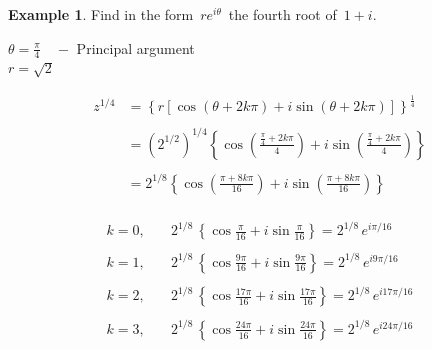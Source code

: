 \documentclass[11pt,a4paper]{article}
\theoremstyle{definition}
\newtheorem{example}[thm]{Example}
\begin{document}
\begin{example}

Find in the form $\,\displaystyle{re^{i\theta}}\,$ the fourth root of $\, 1 + i$.

\begin{figure}[H]
\centering
{}
\end{figure}













$\theta  = \frac{\pi}{4} \quad - $ Principal argument\\

$r = \sqrt{2}$



\begin{align*}
z^{1/4} & = \left\{r \left[ \cos \left(\theta + 2k\pi\right) + i \sin\left(\theta + 2k\pi\right)\right]\right\}^{\frac{1}{4}}\\\\
& = \left(2^{1/2}\right)^{1/4}\left\{ \cos \left(\frac{\frac{\pi}{4} + 2k\pi}{4}\right) + i \sin \left(\frac{\frac{\pi}{4} + 2k\pi}{4}\right)\right\}\\\\ 
& = 2^{1/8}\left\{ \cos \left(\frac{\pi + 8k\pi}{16}\right) + i \sin \left(\frac{\pi + 8k\pi}{16}\right)\right\}\\
\end{align*}





\begin{align*}
k = 0,&  \quad  2^{1/8}\,\left\{\cos \frac{\pi}{16} + i \sin \frac{\pi}{16}\right\}  = 2^{1/8}\,e^{i\pi/ 16}\\\\
k = 1,&  \quad  2^{1/8}\,\left\{\cos \frac{9\pi}{16} + i \sin \frac{9\pi}{16}\right\}  = 2^{1/8}\,e^{i 9\pi/ 16}\\\\
k = 2,&  \quad  2^{1/8}\,\left\{\cos \frac{17\pi}{16} + i \sin \frac{17\pi}{16}\right\}  = 2^{1/8}\,e^{i 17\pi/ 16}\\\\
k = 3,&  \quad  2^{1/8}\,\left\{\cos \frac{24\pi}{16} + i \sin \frac{24\pi}{16}\right\}  = 2^{1/8}\,e^{i 24\pi/ 16}
\end{align*}



\end{example}
\end{document}
